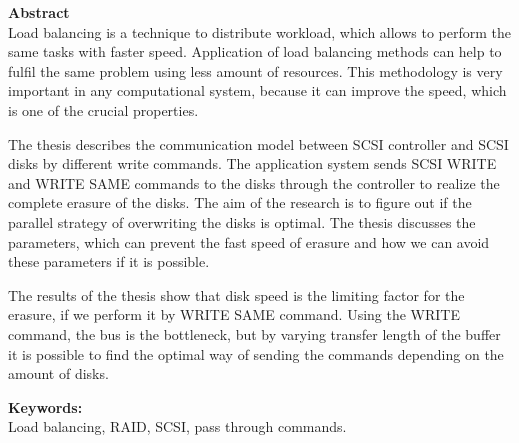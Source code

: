 {\bf Abstract}\\


Load balancing is a technique to distribute workload, which allows to perform the same tasks with faster speed. Application of load balancing methods can help to fulfil the same problem using less amount of resources. This methodology is very important in any computational system, because it can improve the speed, which is one of the crucial properties. 

The thesis describes the communication model between SCSI controller and SCSI disks by different write commands. The application system sends SCSI WRITE and WRITE SAME commands to the disks through the controller to realize the complete erasure of the disks. The aim of the research is to figure out if the parallel strategy of overwriting the disks is optimal. The thesis discusses the parameters, which can prevent the fast speed of erasure and how we can avoid these parameters if it is possible.

 The results of the thesis show that disk speed is the limiting factor for the erasure, if we perform it by WRITE SAME command. Using the WRITE command, the bus is the bottleneck, but by varying transfer length of the buffer it is possible to find the optimal way of sending the commands depending on the amount of disks.





{\bf Keywords:}\\
Load balancing, RAID, SCSI, pass through commands.
